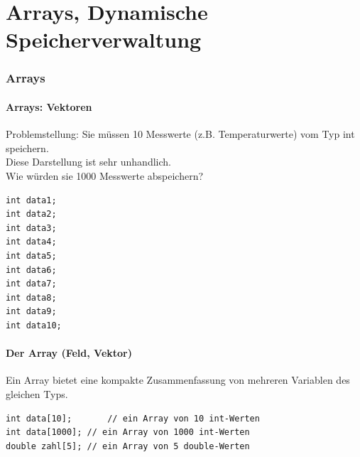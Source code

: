 
\part{Arrays, Dynamische Speicherverwaltung}

\section{Arrays}

\subsection{Arrays: Vektoren}
\begin{minipage}{0.5\linewidth}
Problemstellung: Sie müssen 10 Messwerte (z.B. Temperaturwerte) vom Typ int speichern.\\
\vspace{\baselineskip}
Diese Darstellung ist sehr unhandlich.\\
Wie würden sie 1000 Messwerte abspeichern?
\vfill\null
\end{minipage}
\hspace{0.01\linewidth}
\begin{minipage}{0.15\linewidth}
\begin{lstlisting}
int data1;
int data2;
int data3;
int data4;
int data5;
int data6;
int data7;
int data8;
int data9;
int data10;
\end{lstlisting}
\end{minipage}

\subsection{Der Array (Feld, Vektor)}
\begin{minipage}{0.35\linewidth}
Ein Array bietet eine kompakte Zusammenfassung von mehreren Variablen des gleichen Typs.
\end{minipage}
\hspace{0.01\linewidth}
\noindent
\begin{minipage}{0.6\linewidth}
\begin{lstlisting}
int data[10];		// ein Array von 10 int-Werten
int data[1000];	// ein Array von 1000 int-Werten
double zahl[5];	// ein Array von 5 double-Werten
\end{lstlisting}
\end{minipage}

